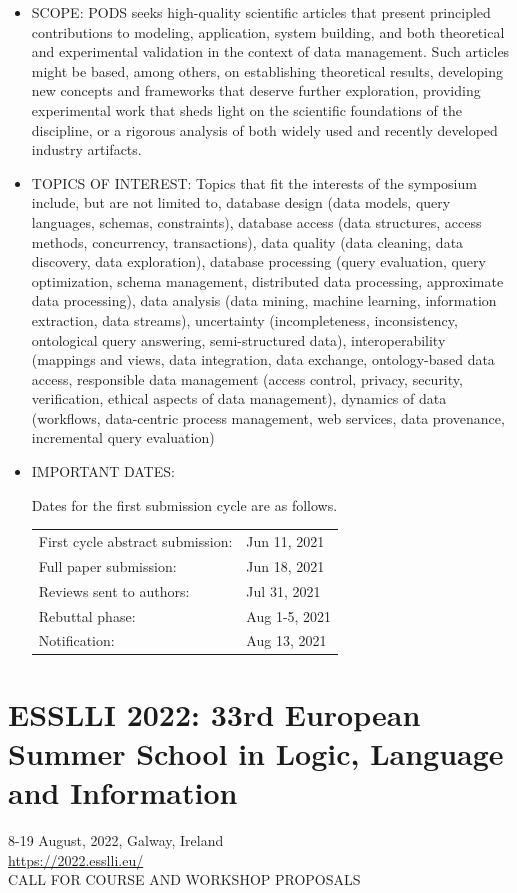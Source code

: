 \documentclass[prodmode,acmtecs]{acmsmall} %
\begin{document}
\begin{itemize}\item  SCOPE: PODS seeks high-quality scientific articles that present principled contributions to modeling, application, system building, and both theoretical and experimental validation in the context of data management. Such articles might be based, among others, on establishing theoretical results, developing new concepts and frameworks that deserve further exploration, providing experimental work that sheds light on the scientific foundations of the discipline, or a rigorous analysis of both widely used and recently developed industry artifacts.  
 
\item  TOPICS OF INTEREST: Topics that fit the interests of the symposium include, but are not limited to, database design (data models, query languages, schemas, constraints), database access (data structures, access methods, concurrency, transactions), data quality (data cleaning, data discovery, data exploration), database processing (query evaluation, query optimization, schema management, distributed data processing, approximate data processing), data analysis (data mining, machine learning, information extraction, data streams), uncertainty (incompleteness, inconsistency, ontological query answering, semi-structured data), interoperability (mappings and views, data integration, data exchange, ontology-based data access, responsible data management (access control, privacy, security, verification, ethical aspects of data management), dynamics of  data (workflows, data-centric process management, web services, data provenance, incremental query evaluation) 
 
\item  IMPORTANT DATES:  
 
  Dates for the first submission cycle are as follows.  
 
\begin{tabulary}{\linewidth}{LL}First cycle abstract submission:  & Jun 11, 2021 \\
Full paper submission:  & Jun 18, 2021 \\
Reviews sent to authors:  & Jul 31, 2021 \\
Rebuttal phase:  & Aug 1-5, 2021 \\
Notification:  & Aug 13, 2021 \\
\end{tabulary}
 
\end{itemize}\section{ESSLLI 2022: 33rd European Summer School in Logic, Language and Information }\label{ESSLLI2022}  8-19 August, 2022, Galway, Ireland\\ 
  \href{https://2022.esslli.eu/}{https://2022.esslli.eu/}\\ 
CALL FOR COURSE AND WORKSHOP PROPOSALS 
\end{document}
